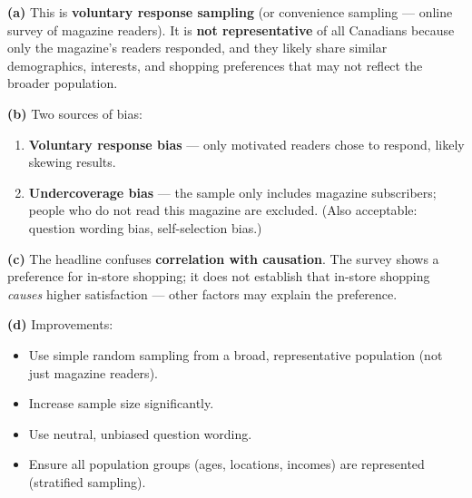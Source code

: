 \documentclass[addpoints]{exam}
\begin{document}
\begin{questions}
\begin{solution}[10cm]
\textbf{(a)} This is \textbf{voluntary response sampling} (or convenience sampling — online survey of
magazine readers). It is \textbf{not representative} of all Canadians because only the magazine's
readers responded, and they likely share similar demographics, interests, and shopping preferences
that may not reflect the broader population.

\textbf{(b)} Two sources of bias:
\begin{enumerate}
\item \textbf{Voluntary response bias} — only motivated readers chose to respond, likely skewing results.
\item \textbf{Undercoverage bias} — the sample only includes magazine subscribers; people who do not
read this magazine are excluded.
(Also acceptable: question wording bias, self-selection bias.)
\end{enumerate}

\textbf{(c)} The headline confuses \textbf{correlation with causation}. The survey shows a preference for
in-store shopping; it does not establish that in-store shopping \textit{causes} higher satisfaction —
other factors may explain the preference.

\textbf{(d)} Improvements:
\begin{itemize}
\item Use simple random sampling from a broad, representative population (not just magazine readers).
\item Increase sample size significantly.
\item Use neutral, unbiased question wording.
\item Ensure all population groups (ages, locations, incomes) are represented (stratified sampling).
\end{itemize}
\end{solution}

\end{questions}
\end{document}
